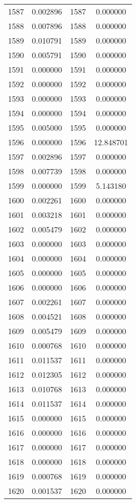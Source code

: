 \documentclass[12pt]{article}
\begin{document}
\begin{longtable}{@{}cccc@{}}
1587 & 0.002896 & 1587 & 0.000000 \\
1588 & 0.007896 & 1588 & 0.000000 \\
1589 & 0.010791 & 1589 & 0.000000 \\
1590 & 0.005791 & 1590 & 0.000000 \\
1591 & 0.000000 & 1591 & 0.000000 \\
1592 & 0.000000 & 1592 & 0.000000 \\
1593 & 0.000000 & 1593 & 0.000000 \\
1594 & 0.000000 & 1594 & 0.000000 \\
1595 & 0.005000 & 1595 & 0.000000 \\
1596 & 0.000000 & 1596 & 12.848701 \\
1597 & 0.002896 & 1597 & 0.000000 \\
1598 & 0.007739 & 1598 & 0.000000 \\
1599 & 0.000000 & 1599 & 5.143180 \\
1600 & 0.002261 & 1600 & 0.000000 \\
1601 & 0.003218 & 1601 & 0.000000 \\
1602 & 0.005479 & 1602 & 0.000000 \\
1603 & 0.000000 & 1603 & 0.000000 \\
1604 & 0.000000 & 1604 & 0.000000 \\
1605 & 0.000000 & 1605 & 0.000000 \\
1606 & 0.000000 & 1606 & 0.000000 \\
1607 & 0.002261 & 1607 & 0.000000 \\
1608 & 0.004521 & 1608 & 0.000000 \\
1609 & 0.005479 & 1609 & 0.000000 \\
1610 & 0.000768 & 1610 & 0.000000 \\
1611 & 0.011537 & 1611 & 0.000000 \\
1612 & 0.012305 & 1612 & 0.000000 \\
1613 & 0.010768 & 1613 & 0.000000 \\
1614 & 0.011537 & 1614 & 0.000000 \\
1615 & 0.000000 & 1615 & 0.000000 \\
1616 & 0.000000 & 1616 & 0.000000 \\
1617 & 0.000000 & 1617 & 0.000000 \\
1618 & 0.000000 & 1618 & 0.000000 \\
1619 & 0.000768 & 1619 & 0.000000 \\
1620 & 0.001537 & 1620 & 0.000000 \\

\end{longtable}
\end{document}
